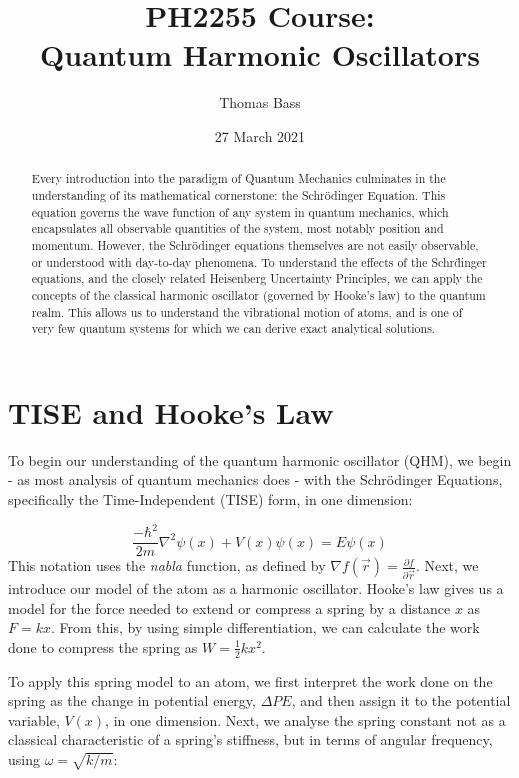 \documentclass[a4paper]{article}
\title{PH2255 Course:\\
Quantum Harmonic Oscillators}
\author{Thomas Bass}
\date{27 March 2021}
\begin{document}
\maketitle

\begin{abstract}
\noindent Every introduction into the paradigm of Quantum Mechanics culminates in the understanding of its mathematical cornerstone: the Schr\"odinger Equation. This equation governs the wave function of any system in quantum mechanics, which encapsulates all observable quantities of the system, most notably position and momentum. However, the Schr\"odinger equations themselves are not easily observable, or understood with day-to-day phenomena. To understand the effects of the Schr\"dinger equations, and the closely related Heisenberg Uncertainty Principles, we can apply the concepts of the classical harmonic oscillator (governed by Hooke's law) to the quantum realm. This allows us to understand the vibrational motion of atoms, and is one of very few quantum systems for which we can derive exact analytical solutions.
\end{abstract}

\section{TISE and Hooke's Law}

To begin our understanding of the quantum harmonic oscillator (QHM), we begin - as most analysis of quantum mechanics does - with the Schr\"odinger Equations, specifically the Time-Independent (TISE) form, in one dimension:

\begin{equation} \label{eq:1}
\frac{-\hbar^2}{2m}\nabla^2\psi(x) + V(x)\psi(x)=E\psi(x)
\end{equation} 
This notation uses the {\it nabla} function, as defined by $\nabla f(\vec r) = \frac{\partial f}{\partial \vec r}$. Next, we introduce our model of the atom as a harmonic oscillator. Hooke's law gives us a model for the force needed to extend or compress a spring by a distance $x$ as $F=kx$. From this, by using simple differentiation, we can calculate the work done to compress the spring as $W=\frac12kx^2$. 

To apply this spring model to an atom, we first interpret the work done on the spring as the change in potential energy, $\Delta PE$, and then assign it to the potential variable, $V(x)$, in one dimension. Next, we analyse the spring constant not as a classical characteristic of a spring's stiffness, but in terms of angular frequency, using $\omega =\sqrt{k/m}$:
\end{document}
